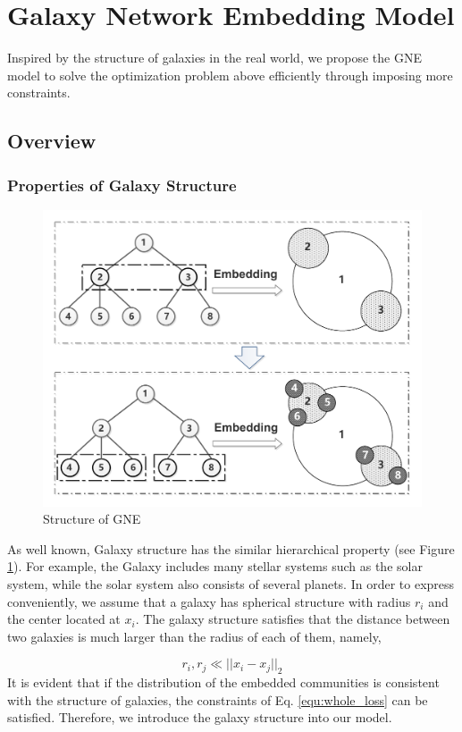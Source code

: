 \documentclass{article}
\theoremstyle{definition}
\begin{document}
	\section{Galaxy Network Embedding Model}
	\label{sec:model}
	Inspired by the structure of galaxies in the real world, we propose the GNE model to solve the optimization problem above efficiently through imposing more constraints.  
	 \subsection {Overview}
	 \subsubsection{Properties of Galaxy Structure}
	 \begin{figure}
		\includegraphics[width=1\linewidth]{figure/Structure.pdf}
		\caption{Structure of GNE}
		\label{fig:structure}
	\end{figure}
	 As well known, Galaxy structure has the similar hierarchical property (see Figure \ref{fig:structure}). For example, the Galaxy includes many stellar systems such as the solar system, while the solar system also consists of several planets. In order to express conveniently, we assume that a galaxy has spherical structure with radius $r_i$ and the center located at $x_i$. The galaxy structure satisfies that the distance between two galaxies is much larger than the radius of each of them, namely, 
	 
	 \begin{equation}
	 	  r_i, r_j \ll ||x_i - x_j||_2 
	 \end{equation}
	 It is evident that if the distribution of the embedded communities is consistent with the structure of galaxies, the constraints of Eq. \ref{equ:whole_loss} can be satisfied. Therefore, we introduce the galaxy structure into our model. 
\end{document}
